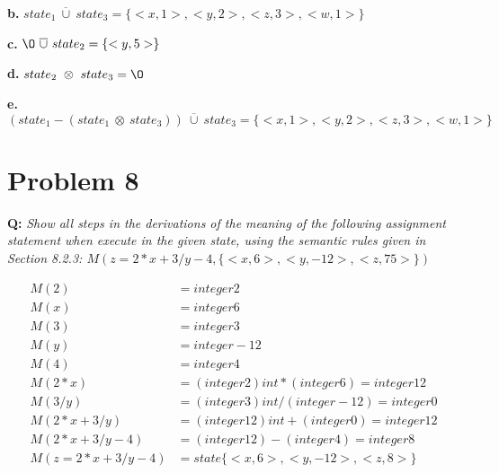 \documentclass{article}
\begin{document}
\textbf{b.} $state_1\ \overline{\cup}\ state_3 = \{<x, 1>, <y, 2>, <z, 3>, <w, 1>\}$

\textbf{c.} $\O\ \overline{\cup}\ state_2 = \{<y, 5>\}$

\textbf{d.} $state_2\ \otimes\ state_3 = \O$

\textbf{e.} $(state_1 - (state_1\ \otimes\ state_3))\ \overline{\cup}\ state_3 = \{<x, 1>, <y, 2>, <z, 3>, <w, 1>\}$

\section*{Problem 8}
\textbf{Q:} \textit{Show all steps in the derivations of the meaning of the following assignment statement when execute in the given state, using the semantic rules given in Section 8.2.3: $M(z=2*x+3/y-4,\{<x,6>,<y,-12>,<z,75>\})$}

\begin{align*}
M(2) &= integer 2 \\
M(x) &= integer 6 \\
M(3) &= integer 3 \\
M(y) &= integer -12 \\
M(4) &= integer 4 \\
M(2 * x) &= (integer 2) int* (integer 6) = integer 12 \\
M(3 / y) &= (integer 3) int/ (integer -12) = integer 0 \\
M(2 * x + 3 / y) &= (integer 12) int+ (integer 0) = integer 12 \\
M(2 * x + 3 / y - 4) &= (integer 12) - (integer 4) = integer 8 \\
M(z = 2 * x + 3 / y - 4) &= state \{<x,6>,<y,-12>,<z,8>\}
\end{align*}
\end{document}
